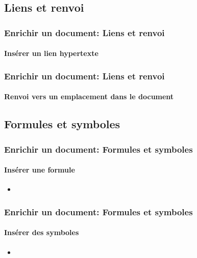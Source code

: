 \documentclass[xcolor=table]{beamer}
\begin{document}
\subsection{Liens et renvoi}

\begin{frame}
\frametitle{Enrichir un document: Liens et renvoi}
\framesubtitle{Insérer un lien hypertexte}

\end{frame}

\begin{frame}
\frametitle{Enrichir un document: Liens et renvoi}
\framesubtitle{Renvoi vers un emplacement dans le document}

\end{frame}

\subsection{Formules et symboles}

\begin{frame}
\frametitle{Enrichir un document: Formules et symboles}
\framesubtitle{Insérer une formule}


\begin{minipage}{0.76\textwidth}
	\begin{itemize}
		\item 
	\end{itemize}
\end{minipage}
\begin{minipage}{0.23\textwidth}
		
\end{minipage}

\end{frame}

\begin{frame}
\frametitle{Enrichir un document: Formules et symboles}
\framesubtitle{Insérer des symboles}

\begin{minipage}{0.50\textwidth}
	\begin{itemize}
		\item 
	\end{itemize}
\end{minipage}
\begin{minipage}{0.49\textwidth}
	
\end{minipage}

\end{frame}
\end{document}
